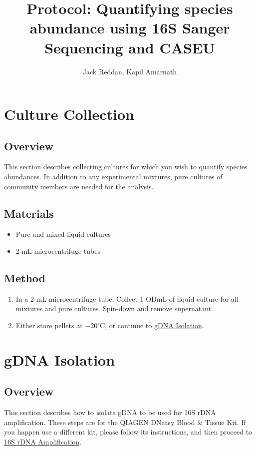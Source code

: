 \documentclass[onecolumn]{article}
\begin{document}
\title{Protocol: Quantifying species abundance using 16S Sanger Sequencing and CASEU}
\author{Jack Reddan, Kapil Amarnath}

\maketitle{}

\tableofcontents{}
\newpage

\section{Culture Collection}\label{CC}
\subsection{Overview}
This section describes collecting cultures for which you wish to quantify species abundances.
In addition to any experimental mixtures,
pure cultures of community members are needed for the analysis.

\subsection{Materials}
\begin{itemize}
  \item Pure and mixed liquid cultures
  \item 2-mL microcentrifuge tubes
\end{itemize}

\subsection{Method}
\begin{enumerate}
  \item In a 2-mL microcentrifuge tube, Collect 1 ODmL of liquid culture for all mixtures and pure cultures. Spin-down and remove supernatant.
  \item Either store pellets at $-20^\circ$C, or continue to \hyperref[GI]{gDNA Isolation}.
\end{enumerate}

\section{gDNA Isolation}\label{GI}
\subsection{Overview}
This section describes how to isolate gDNA to be used for 16S rDNA amplification.
These steps are for the QIAGEN DNeasy Blood \& Tissue Kit.
If you happen use a different kit,
please follow its instructions,
and then proceed to \hyperref[1rA]{16S rDNA Amplification}.
\end{document}
